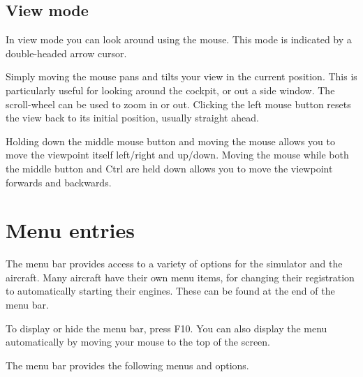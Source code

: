 \subsection{View mode}

In view mode you can look around using the mouse. This mode is indicated by a double-headed
arrow cursor.

Simply moving the mouse pans and tilts your view in the current position. This is
particularly useful for looking around the cockpit, or out a side window. The
scroll-wheel can be used to zoom in or out. Clicking the left mouse button
resets the view back to its initial position, usually straight ahead.

Holding down the middle mouse button and moving the mouse allows you to move the viewpoint
itself left/right and up/down. Moving the mouse while both the middle button and Ctrl are
held down allows you to move the viewpoint forwards and backwards.

\section{Menu entries}

The menu bar provides access to a variety of options for the simulator and the aircraft.
Many aircraft have their own menu items, for changing their registration to automatically
starting their engines. These can be found at the end of the menu bar.

To display or hide the menu bar, press F10. You can also display the menu automatically
by moving your mouse to the top of the screen.

The menu bar provides the following menus and options.

